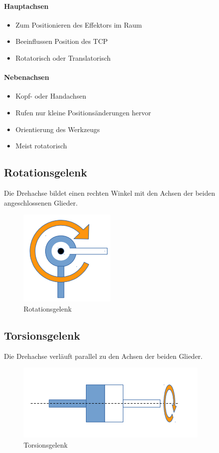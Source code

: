 \paragraph{Hauptachsen}
\begin{itemize}
	\item Zum Positionieren des Effektors im Raum
	\item Beeinflussen Position des TCP
	\item Rotatorisch oder Translatorisch
\end{itemize}
\paragraph{Nebenachsen}
\begin{itemize}
	\item Kopf- oder Handachsen
	\item Rufen nur kleine Positionsänderungen hervor
	\item Orientierung des Werkzeugs
	\item Meist rotatorisch
\end{itemize}
\subsection{Rotationsgelenk}
Die Drehachse bildet einen rechten Winkel mit den Achsen der beiden angeschlossenen Glieder.
\begin{figure}[H]
	\begin{center}
		\includegraphics[scale=0.6]{Resources/PNG/Rotationsgelenk.PNG}
		\caption{Rotationsgelenk}
		\label{fig:Resources/PNG/Rotationsgelenk}
	\end{center}
\end{figure}
\subsection{Torsionsgelenk}
Die Drehachse verläuft parallel zu den Achsen der beiden Glieder.
\begin{figure}[H]
	\begin{center}
		\includegraphics[scale=0.6]{Resources/PNG/Torsionsgelenk.PNG}
		\caption{Torsionsgelenk}
		\label{fig:Resources/PNG/Torsionsgelenk}
	\end{center}
\end{figure}
